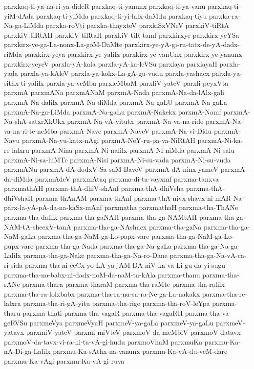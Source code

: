 {parxkaq-ti-ya-na-ri-ya-dideR
parxkaq-ti-yanunx
parxkaq-ti-ya-vanu
parxkaq-ti-yiM-dAda
parxkaq-ti-yiMda
parxkaq-ti-yi-lalx-daMdu
parxkaq-tiyu
parxka-ra-Na-ga-LiMda
parxka-roVti
parxka-thayxteV
parxkiSxVNeV
parxkiV-tiRtA
parxkiV-tiRtAH
parxkiV-tiRtaH
parxkiV-tiR-tamf
parxkirxye
parxkirx-yeYSa
parxkirx-ye-ga-La-nonx-La-goM-DaMte
parxkirx-ye-yA-gi-ru-tatx-de-yA-dadx-riMda
parxkirx-yeya
parxkirx-ye-yalilx
parxkirx-ye-yanUnx
parxkirx-ye-yanunx
parxkirx-yeyeV
parxla-yA-kala
parxla-yA-ka-leVSu
parxlaya
parxlayaH
parxla-yada
parxla-ya-kAleV
parxla-ya-kokx-La-gA-gu-vudu
parxla-yashacx
parxla-ya-sithx-ti-yalilx
parxla-ya-veMba
parxleMbaM
parxliV-yateV
parxli-peyxVta
parxmA
parxmANa
parxmANaM
parxmA-Nada
parxmA-Na-da-lAlx-gali
parxmA-Na-dalilx
parxmA-Na-diMda
parxmA-Na-gaLU
parxmA-Na-gaLa
parxmA-Na-ga-LiMda
parxmA-Na-gaLu
parxmA-Nakekx
parxmA-Namf
parxmA-Na-shA-satxrXkUkx
parxmA-Na-vA-yitutx
parxmA-Na-va-na-ride
parxmA-Na-va-na-ri-te-neMba
parxmA-Nave
parxmA-NaveV
parxmA-Na-vi-Didu
parxmA-Navu
parxmA-Na-yu-katx-nAgi
parxmA-NeY-ru-pa-va-NiRtAH
parxmA-Ni-ka-re-lalxru
parxmA-Nina
parxmA-Ni-nalilx
parxmA-Ni-niMda
parxmA-Ni-salu
parxmA-Ni-sa-luMTe
parxmA-Nisi
parxmA-Ni-su-vada
parxmA-Ni-su-vuda
parxmANu
parxmA-dA-dodxV-Sa-saM-BaveV
parxmA-dA-ninx-yameV
parxmA-da-diMda
parxmAdeV
parxmAtaq
parxma-di-ta-vayxmf
parxma-tanxva
parxmathAH
parxma-thA-dhiV-shAnf
parxma-thA-dhiVsha
parxma-thA-dhiVshaH
parxma-thAnAM
parxma-thAnf
parxma-thA-nivx-shavx-ni-mAR-Na-parx-la-yA-pA-da-na-kaSx-mAnf
parxmatha
parxmathaH
parxma-tha-ThANe
parxma-tha-dalilx
parxma-tha-gaNAH
parxma-tha-ga-NAMtAH
parxma-tha-ga-NAM-tA-shecxV-tanA
parxma-tha-ga-NAshacx
parxma-tha-gaNa
parxma-tha-ga-NaM-gaLa
parxma-tha-ga-NaM-ga-Lo-papx-vare
parxma-tha-ga-NaM-ga-Lo-pupx-vare
parxma-tha-ga-Nada
parxma-tha-ga-Na-gaLa
parxma-tha-ga-Na-ga-Lalilx
parxma-tha-ga-Nake
parxma-tha-ga-Na-ro-Dane
parxma-tha-ga-Na-vA-ca-ri-sida
parxma-tha-ni-ceCx-yo-LA-ya-jAM-DA-niV-ka-va-Li-gu-da-yi-sugu
parxma-tha-no-babx-ni-dadx-noM-da-naM-ta-kAla
parxma-thanu
parxma-tha-rANe
parxma-thara
parxma-tharaM
parxma-tha-raMte
parxma-tha-ralilx
parxma-tha-ra-lolxbabx
parxma-tha-ra-nu-sa-ra-Ne-ga-La-nakakx
parxma-tha-re-lalxra
parxma-tha-ri-gA-yitu
parxma-tha-rige
parxma-tha-roV-leYpa
parxma-tharu
parxma-thati
parxma-tha-vagaR
parxma-tha-vagaRH
parxma-tha-va-geRVSu
parxmeVya
parxmeVyaH
parxmeV-ya-gaLa
parxmeV-ya-gaLu
parxmeV-yatavx
parxmiV-yateV
parxmi-miVteV
parxmoV-da-meMbiV
parxmoV-datavx
parxmoV-da-tavx-vi-ra-hi-ta-vA-gi-hudu
parxmoVhaM
parxmuKa
parxmu-Ka-nA-Di-ga-Lalilx
parxmu-Ka-sAthx-na-vanunx
parxmu-Ka-vA-du-veM-dare
parxmu-Ka-vAgi
parxmu-Ka-vA-gi-ruva
}
